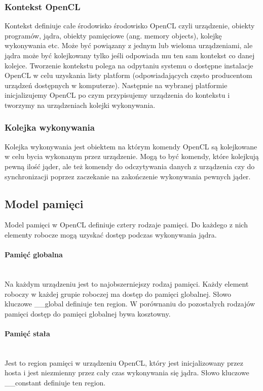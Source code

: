 \documentclass[polish, 12pt]{aghthesis}
\begin{document}
	\clearpage
	\subsubsection{Kontekst OpenCL}
		Kontekst definiuje całe środowisko środowisko OpenCL czyli urządzenie, obiekty programów, jądra, obiekty pamięciowe (ang. memory objects), kolejkę wykonywania etc. Może być powiązany z jednym lub wieloma urządzeniami, ale jądra może być kolejkowany tylko jeśli odpowiada mu ten sam kontekst co danej kolejce.
		Tworzenie kontekstu polega na odpytaniu systemu o dostępne instalacje OpenCL w celu uzyskania listy platform (odpowiadających często producentom urządzeń dostępnych w komputerze). Następnie na wybranej platformie inicjalizujemy OpenCL po czym przypisujemy urządzenia do kontekstu i tworzymy na urządzeniach kolejki wykonywania.
		
	\subsubsection{Kolejka wykonywania}
	Kolejka wykonywania jest obiektem na którym komendy OpenCL są kolejkowane w celu bycia wykonanym przez urządzenie. Mogą to być komendy, które kolejkują pewną ilość jąder, ale też komendy do odczytywania danych z urządzenia czy do synchronizacji poprzez zaczekanie na zakończenie wykonywania pewnych jąder.
	
	\subsection{Model pamięci}
	
	Model pamięci w OpenCL definiuje cztery rodzaje pamięci. Do każdego z nich elementy robocze mogą uzyskać dostęp podczas wykonywania jądra. 
	
	\paragraph{Pamięć globalna}\ \\
		Na każdym urządzeniu jest to najobszerniejszy rodzaj pamięci. Każdy element roboczy w każdej grupie roboczej ma dostęp do pamięci globalnej. Słowo kluczowe \_\_global definiuje ten region. W porównaniu do pozostałych rodzajów pamięci dostęp do pamięci globalnej bywa kosztowny.
	\paragraph{Pamięć stała}\ \\
		Jest to region pamięci w urządzeniu OpenCL, który jest inicjalizowany przez hosta i jest niezmienny przez cały czas wykonywania się jądra. Słowo kluczowe \_\_constant definiuje ten region.
\end{document}
